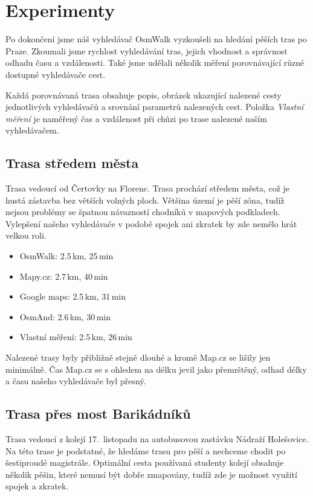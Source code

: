 \chapter{Experimenty}
Po dokončení jsme náš vyhledávač OsmWalk vyzkoušeli na hledání pěších tras po
Praze. Zkoumali jsme rychlost vyhledávání tras, jejich vhodnost a správnost
odhadu času a vzdálenosti. Také jsme udělali několik měření porovnávající různé
dostupné vyhledávače cest.

Každá porovnávaná trasa obsahuje popis, obrázek ukazující nalezené cesty
jednotlivých vyhledávačů a srovnání parametrů nalezených cest. Položka {\it
Vlastní měření} je naměřený čas a vzdálenost při chůzi po trase nalezené naším
vyhledávačem. 

\section{Trasa středem města}
Trasa vedoucí od Čertovky na Florenc. Trasa prochází středem města, což je hustá
zástavba bez větších volných ploch. Většina území je pěší zóna, tudíž nejsou
problémy se špatnou návazností chodníků v mapových podkladech. Vylepšení našeho
vyhledávače v podobě spojek ani zkratek by zde nemělo hrát velkou roli.
\begin{itemize}
	\item OsmWalk: 2.5\,km, 25\,min
	\item Mapy.cz: 2.7\,km, 40\,min
	\item Google maps: 2.5\,km, 31\,min
	\item OsmAnd: 2.6\,km, 30\,min
	\item Vlastní měření: 2.5\,km, 26\,min
\end{itemize}
Nalezené trasy byly přibližně stejně dlouhé a kromě Map.cz se lišily jen
minimálně. Čas Map.cz se s ohledem na délku jevil jako přemrštěný, odhad délky a
času našeho vyhledávače byl přesný. 


\section{Trasa přes most Barikádníků}
Trasa vedoucí z kolejí 17.~listopadu na autobusovou zastávku Nádraží Holešovice.
Na této trase je podstatné, že hledáme trasu pro pěší a nechceme chodit po
šestiproudé magistrále. Optimální cesta používaná studenty kolejí obsahuje
několik pěšin, které nemusí být dobře zmapovány, tudíž zde je možnost využití
spojek a zkratek.

